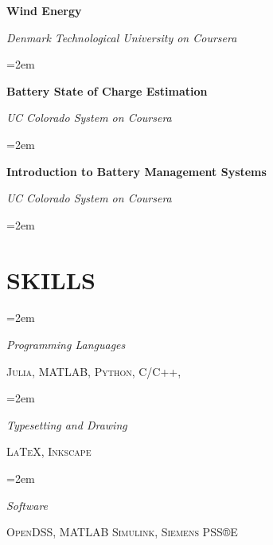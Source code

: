 \documentclass[paper=a4,fontsize=11pt]{scrartcl} %
\newlength{\spacebox}
\newcommand{\sepspace}{\vspace*{1em}}		%
\newcommand{\NewPart}[1]{\section*{\uppercase{#1}}}
\newcommand{\PersonalEntry}[2]{
		\noindent\hangindent=2em\hangafter=0 %
		\parbox{\spacebox}{        %
		\textit{#1}}		       %
		\hspace{1.5em} #2 \par}    %
\newcommand{\SkillsEntry}[2]{      %
		\noindent\hangindent=2em\hangafter=0 %
		\parbox{\spacebox}{        %
		\textit{#1}}			   %
		\hspace{1.5em} #2 \par}    %
\newcommand{\EducationEntry}[4]{
		\noindent \textbf{#1} \hfill      %
		\colorbox{Black}{%
			\parbox{10em}{%
			\hfill\color{White}#2}} \par  %
		\noindent \textit{#3} \par        %
		\noindent\hangindent=2em\hangafter=0 \small #4 %
		\normalsize \par}
\newcommand{\WorkEntry}[4]{				  %
		\noindent \textbf{#1} \hfill      %
		\colorbox{Black}{\color{White}#2} \par  %
		\noindent \textit{#3} \par              %
		\noindent\hangindent=2em\hangafter=0 \small #4 %
		\normalsize \par}
\begin{document}
\WorkEntry{Wind Energy}{}{Denmark Technological University on Coursera \href{https://www.coursera.org/account/accomplishments/certificate/K7HX27Y43F2F}{\faExternalLink*}}{}
\sepspace
\WorkEntry{Battery State of Charge Estimation}{}{UC Colorado System on Coursera \href{https://www.coursera.org/account/accomplishments/certificate/VCFGDSAZUVX8}{\faExternalLink*}}{}
\sepspace
\WorkEntry{Introduction to Battery Management Systems}{}{UC Colorado System on Coursera \href{https://www.coursera.org/account/accomplishments/certificate/LBXFVNBBJG87}{\faExternalLink*}}{}
\sepspace



\NewPart{Skills}{}


\SkillsEntry{Programming Languages}{\textsc{Julia}, \textsc{MATLAB}, \textsc{Python}, \textsc{C/C++},}
\sepspace

\SkillsEntry{Typesetting and Drawing}{\textsc{\LaTeX}, \textsc{Inkscape}}
\sepspace

\SkillsEntry{Software}{\textsc{OpenDSS}, \textsc{MATLAB Simulink}, \textsc{Siemens PSS®E}}
\sepspace



\end{document}

